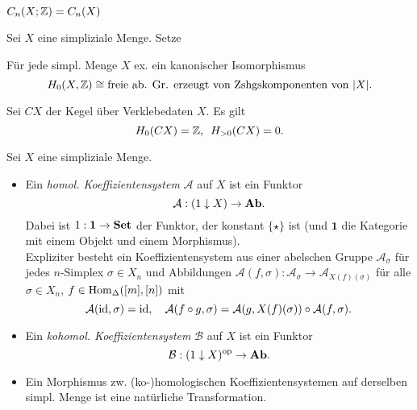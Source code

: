 \documentclass{cheat-sheet}
\begin{document}
\begin{beob}
  $C_n(X; \mathbb{Z}) = C_n(X)$
\end{beob}

\begin{nota}
  Sei $X$ eine simpliziale Menge. Setze
  \begin{itemize}
  \end{itemize}
\end{nota}

\begin{prop}
  Für jede simpl. Menge $X$ ex. ein kanonischer Isomorphismus
  \[ H_0(X, \mathbb{Z}) \cong \text{freie ab. Gr. erzeugt von Zshgskomponenten von $\lvert X\rvert$}. \]
\end{prop}

\begin{prop}
  Sei $CX$ der Kegel über Verklebedaten $X$. Es gilt
  \[ H_0(CX) = \mathbb{Z}, \enspace H_{>0}(CX) = 0. \]
\end{prop}



\begin{defn}
  Sei $X$ eine simpliziale Menge.
  \begin{itemize}
    \item Ein \emph{homol. Koeffizientensystem} $\mathcal{A}$ auf $X$ ist ein Funktor
    \[ \mathcal{A} : (1 \downarrow X) \to \mathbf{Ab}. \]
    Dabei ist $1 : \mathbf{1} \to \mathbf{Set}$ der Funktor, der konstant $\{ \star \}$ ist (und $\mathbf{1}$ die Kategorie mit einem Objekt und einem Morphismus).\\
    Expliziter besteht ein Koeffizientensystem aus einer abelschen Gruppe $\mathcal{A}_\sigma$ für jedes $n$-Simplex $\sigma \in X_n$ und Abbildungen $\mathcal{A}(f, \sigma) : \mathcal{A}_\sigma \to \mathcal{A}_{X(f)(\sigma)}$ für alle $\sigma \in X_n$, $f \in \operatorname{Hom}_{\Delta}([m], [n])$ mit
    \[
      \mathcal{A}(\operatorname{id}, \sigma) = \operatorname{id}, \quad
      \mathcal{A}(f \circ g, \sigma) = \mathcal{A}(g, X(f)(\sigma)) \circ \mathcal{A}(f, \sigma).
    \]
    \item Ein \emph{kohomol. Koeffizientensystem} $\mathcal{B}$ auf $X$ ist ein Funktor
    \[ \mathcal{B} : (1 \downarrow X)^{\mathrm{op}} \to \mathbf{Ab}. \]
    \item Ein Morphismus zw. (ko-)homologischen Koeffizientensystemen auf derselben simpl. Menge ist eine natürliche Transformation.
  \end{itemize}
\end{defn}
\end{document}
